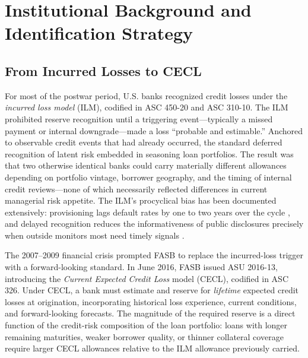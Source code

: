 
\section{Institutional Background and Identification Strategy}
\label{sec:background}

\subsection{From Incurred Losses to CECL}
\label{sec:background:transition}

For most of the postwar period, U.S. banks recognized credit losses under the
\textit{incurred loss model} (ILM), codified in ASC 450-20 and ASC 310-10. The
ILM prohibited reserve recognition until a triggering event—typically a missed
payment or internal downgrade—made a loss ``probable and estimable.'' Anchored to
observable credit events that had already occurred, the standard deferred
recognition of latent risk embedded in seasoning loan portfolios. The result was
that two otherwise identical banks could carry materially different allowances
depending on portfolio vintage, borrower geography, and the timing of internal
credit reviews—none of which necessarily reflected differences in current
managerial risk appetite. The ILM's procyclical bias has been documented
extensively: provisioning lags default rates by one to two years over the cycle
\citep{BeattyLiao2011}, and delayed recognition reduces the informativeness of
public disclosures precisely when outside monitors most need timely signals
\citep{BushmanWilliams2012, BushmanWilliams2015}.

The 2007–2009 financial crisis prompted FASB to replace the incurred-loss trigger
with a forward-looking standard. In June 2016, FASB issued ASU 2016-13,
introducing the \textit{Current Expected Credit Loss} model (CECL), codified in
ASC 326. Under CECL, a bank must estimate and reserve for \textit{lifetime}
expected credit losses at origination, incorporating historical loss experience,
current conditions, and forward-looking forecasts. The magnitude of the required
reserve is a direct function of the credit-risk composition of the loan portfolio:
loans with longer remaining maturities, weaker borrower quality, or thinner
collateral coverage require larger CECL allowances relative to the ILM allowance
previously carried.

